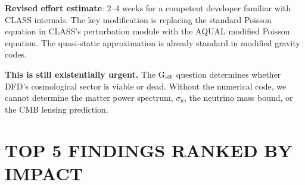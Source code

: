 \documentclass[11pt]{article}
\begin{document}
\textbf{Revised effort estimate}: 2--4 weeks for a competent developer
familiar with CLASS internals. The key modification is replacing the
standard Poisson equation in CLASS's perturbation module with the AQUAL
modified Poisson equation. The quasi-static approximation is already
standard in modified gravity codes.

\textbf{This is still existentially urgent.} The G$_{\rm eff}$ question
determines whether DFD's cosmological sector is viable or dead. Without
the numerical code, we cannot determine the matter power spectrum, $\sigma_8$,
the neutrino mass bound, or the CMB lensing prediction.


\section*{TOP 5 FINDINGS RANKED BY IMPACT}
\end{document}
